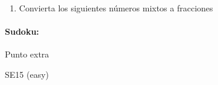 \documentclass[fleqn]{article}
\begin{document}
\begin{enumerate}
\begin{enumerate}
\noanswer[.25in]
\end{enumerate}
\item Convierta los siguientes números mixtos a fracciones
\begin{enumerate}
\end{enumerate}
\noanswer[.25in]
 \end{enumerate}
\paragraph*{Sudoku:} Punto extra
\cluefont{\Large}
\begin{minipage}{0.45\linewidth}\begin{center}
SE15 (easy) \\
\end{center}\end{minipage}
\end{document}
